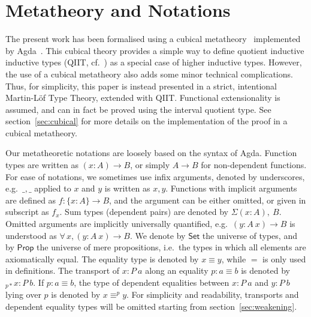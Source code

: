 \documentclass[a4paper,english]{lipics-v2019}
\newcommand{\agdaSymb}[1]{\mathsf{#1}}
\newcommand{\Set}{\agdaSymb{Set}}
\newcommand{\Prop}{\agdaSymb{Prop}}
\begin{document}
\section{Metatheory and Notations}
\label{sec:theory}
The present work has been formalised using a cubical metatheory~\cite{cchm}
implemented by Agda~\cite{norell2007agda}. This cubical theory provides a simple
way to define quotient inductive inductive types (QIIT, cf.~\cite{kaposi2016type})
as a special case of higher inductive types. However, the use of a cubical
metatheory also adds some minor technical complications. Thus, for simplicity,
this paper is instead presented in a strict, intentional Martin-Löf Type Theory,
extended with QIIT. Functional extensionality is assumed, and can in fact be
proved using the interval quotient type. See section~\ref{sec:cubical} for more
details on the implementation of the proof in a cubical metatheory.

Our metatheoretic notations are loosely based on the syntax of Agda. Function
types are written as $(x : A) \to B$, or simply $A \to B$ for non-dependent
functions. For ease of notations, we sometimes use infix arguments, denoted by
underscores, e.g.\ $\_,\_$ applied to $x$ and $y$ is written as $x,y$.
Functions with implicit arguments are defined as $f : \{x : A\} \to B$, and the
argument can be either omitted, or given in subscript as $f_x$. Sum types
(dependent pairs) are denoted by $\Sigma(x : A),\ B$. Omitted arguments are
implicitly universally quantified, e.g.\ $(y : A\ x) \to B$ is understood as
$\forall\,x, (y : A\ x) \to B$. We denote by $\Set$ the universe of types,
and by $\Prop$ the universe of mere propositions, i.e.\ the types in which all
elements are axiomatically equal.
The equality type is denoted by $x \equiv y$, while $=$ is only used in
definitions. The transport of $x : P\ a$ along an equality $p : a \equiv b$ is
denoted by $_{p*}x : P\ b$. If $p : a \equiv b$, the type of dependent
equalities between $x : P\ a$ and $y : P\ b$ lying over $p$ is denoted by
$x \equiv^p y$. For simplicity and readability, transports and dependent
equality types will be omitted starting from section~\ref{sec:weakening}.
\end{document}
